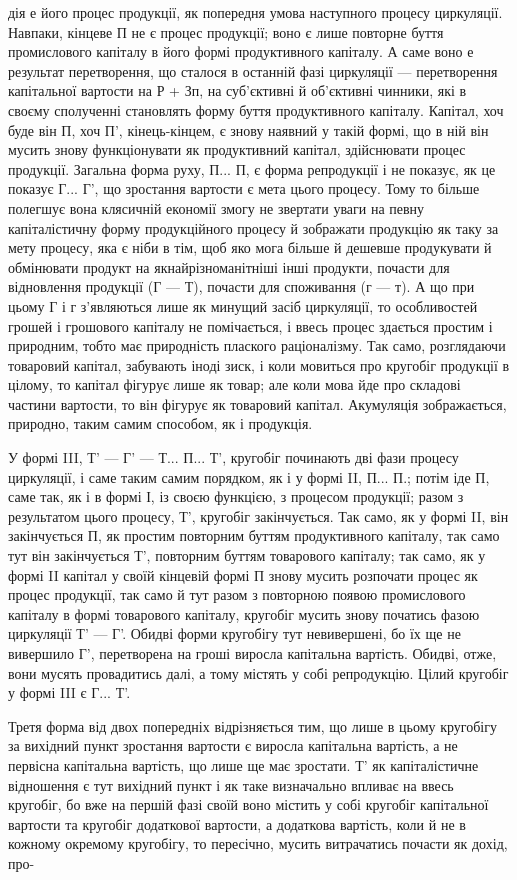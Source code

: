дія е його процес продукції, як попередня умова наступного процесу
циркуляції. Навпаки, кінцеве П не є процес продукції; воно є лише
повторне буття промислового капіталу в його формі продуктивного
капіталу. А саме воно е результат перетворення, що сталося в
останній фазі циркуляції — перетворення капітальної вартости на Р + Зп,
на суб’єктивні й об’єктивні чинники, які в своєму сполученні становлять
форму буття продуктивного капіталу. Капітал, хоч буде він П, хоч П',
кінець-кінцем, є знову наявний у такій формі, що в ній він мусить знову
функціонувати як продуктивний капітал, здійснювати процес продукції.
Загальна форма руху, П... П, є форма репродукції і не показує, як це показує
Г... Г', що зростання вартости є мета цього процесу. Тому то більше полегшує
вона клясичній економії змогу не звертати уваги на певну капіталістичну
форму продукційного процесу й зображати продукцію як таку
за мету процесу, яка є ніби в тім, щоб яко мога більше й дешевше
продукувати й обмінювати продукт на якнайрізноманітніші інші продукти,
почасти для відновлення продукції (Г — Т), почасти для споживання
(г — т). А що при цьому Г і г з’являються лише як минущий засіб
циркуляції, то особливостей грошей і грошового капіталу не помічається, і
ввесь процес здається простим і природним, тобто має природність
плаского раціоналізму. Так само, розглядаючи товаровий капітал, забувають
іноді зиск, і коли мовиться про кругобіг продукції в цілому, то капітал
фігурує лише як товар; але коли мова йде про складові частини вартости,
то він фігурує як товаровий капітал. Акумуляція зображається, природно,
таким самим способом, як і продукція.

У формі III, Т' — Г' — Т... П... Т', кругобіг починають дві фази
процесу циркуляції, і саме таким самим порядком, як і у формі II,
П... П.; потім іде П, саме так, як і в формі І, із своєю функцією,
з процесом продукції; разом з результатом цього процесу, Т', кругобіг
закінчується. Так само, як у формі II, він закінчується П, як простим
повторним буттям продуктивного капіталу, так само тут він закінчується
Т', повторним буттям товарового капіталу; так само, як у
формі II капітал у своїй кінцевій формі П знову мусить розпочати
процес як процес продукції, так само й тут разом з повторною появою
промислового капіталу в формі товарового капіталу, кругобіг мусить
знову початись фазою циркуляції Т' — Г'. Обидві форми кругобігу тут
невивершені, бо їх ще не вивершило Г', перетворена на гроші виросла
капітальна вартість. Обидві, отже, вони мусять провадитись далі, а тому
містять у собі репродукцію. Цілий кругобіг у формі III є Г... Т'.

Третя форма від двох попередніх відрізняється тим, що лише в цьому
кругобігу за вихідний пункт зростання вартости є виросла капітальна
вартість, а не первісна капітальна вартість, що лише ще має зростати.
Т' як капіталістичне відношення є тут вихідний пункт і як таке визначально
впливає на ввесь кругобіг, бо вже на першій фазі
своїй воно містить у собі кругобіг капітальної вартости та кругобіг
додаткової вартости, а додаткова вартість, коли й не в кожному окремому
кругобігу, то пересічно, мусить витрачатись почасти як дохід, про-
